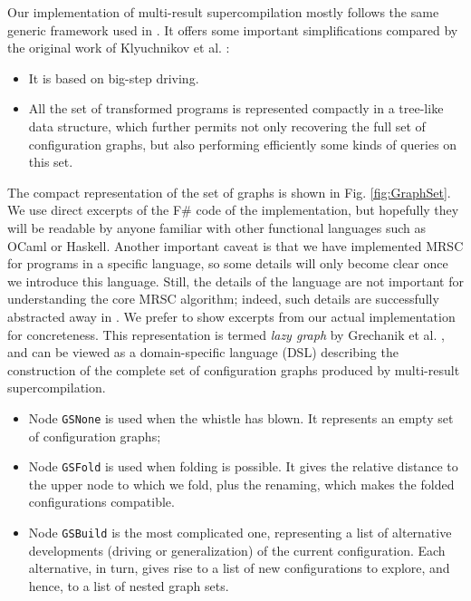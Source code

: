 \documentclass[submission,copyright,creativecommons]{eptcs}
\begin{document}
Our implementation of multi-result supercompilation mostly follows the same
generic framework used in \cite{Romanenko2014StagedMRSC,krustev2014approach}.
It offers some important simplifications compared by the original work
of Klyuchnikov et al. \cite{KlyuchnikovMRSCBranch,Klyuchnikov:META2012:MRSC}:
\begin{itemize}
  \item It is based on big-step driving.
  \item All the set of transformed programs is represented compactly
    in a tree-like data structure, which further permits not only
    recovering the full set of configuration graphs, but also
    performing efficiently some kinds of queries on this set.
\end{itemize}
The compact representation of the set of graphs is shown in Fig. \ref{fig:GraphSet}.
We use direct excerpts of the F\# code of the implementation, but hopefully
they will be readable by anyone familiar with other functional languages such as OCaml or Haskell.
Another important caveat is that we have implemented MRSC for programs in a specific language,
so some details will only become clear once we introduce this language.
Still, the details of the language are not important for understanding the core
MRSC algorithm; indeed, such details are successfully abstracted away in \cite{Romanenko2014StagedMRSC,krustev2014approach}.
We prefer to show excerpts from our actual implementation for concreteness.
This representation is termed \emph{lazy graph} by Grechanik et al. \cite{Romanenko2014StagedMRSC},
and can be viewed as a domain-specific language (DSL) describing the construction of the
complete set of configuration graphs produced by multi-result supercompilation.
\begin{itemize}
  \item Node \verb|GSNone| is used when the whistle has blown. 
    It represents an empty set of configuration graphs;
  \item Node \verb|GSFold| is used when folding is possible. 
    It gives the relative distance to the upper node to which we fold, 
    plus the renaming, which makes the folded configurations compatible.
  \item Node \verb|GSBuild| is the most complicated one, representing a list
    of alternative developments (driving or generalization) of the current configuration.
    Each alternative, in turn, gives rise to a list of new configurations to explore,
    and hence, to a list of nested graph sets.
\end{itemize}
\end{document}
